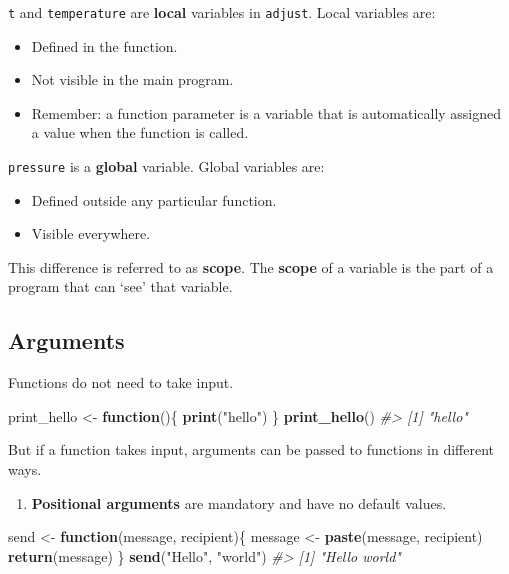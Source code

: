 \documentclass[]{book}
\newenvironment{Shaded}{\begin{snugshade}}{\end{snugshade}}
\newcommand{\KeywordTok}[1]{\textcolor[rgb]{0.13,0.29,0.53}{\textbf{#1}}}
\newcommand{\StringTok}[1]{\textcolor[rgb]{0.31,0.60,0.02}{#1}}
\newcommand{\CommentTok}[1]{\textcolor[rgb]{0.56,0.35,0.01}{\textit{#1}}}
\newcommand{\ControlFlowTok}[1]{\textcolor[rgb]{0.13,0.29,0.53}{\textbf{#1}}}
\newcommand{\NormalTok}[1]{#1}
\providecommand{\tightlist}{%
  \setlength{\itemsep}{0pt}\setlength{\parskip}{0pt}}
\begin{document}
\texttt{t} and \texttt{temperature} are \textbf{local} variables in
\texttt{adjust}. Local variables are:

\begin{itemize}
\tightlist
\item
  Defined in the function.
\item
  Not visible in the main program.
\item
  Remember: a function parameter is a variable that is automatically
  assigned a value when the function is called.
\end{itemize}

\texttt{pressure} is a \textbf{global} variable. Global variables are:

\begin{itemize}
\tightlist
\item
  Defined outside any particular function.
\item
  Visible everywhere.
\end{itemize}

This difference is referred to as \textbf{scope}. The \textbf{scope} of
a variable is the part of a program that can `see' that variable.

\subsection{Arguments}\label{arguments-1}

Functions do not need to take input.

\begin{Shaded}
\begin{Highlighting}[]
\NormalTok{print_hello <-}\StringTok{ }\ControlFlowTok{function}\NormalTok{()\{}
    \KeywordTok{print}\NormalTok{(}\StringTok{"hello"}\NormalTok{)}
\NormalTok{\}}
\KeywordTok{print_hello}\NormalTok{()}
\CommentTok{#> [1] "hello"}
\end{Highlighting}
\end{Shaded}

But if a function takes input, arguments can be passed to functions in
different ways.

\begin{enumerate}
\def\labelenumi{\arabic{enumi})}
\tightlist
\item
  \textbf{Positional arguments} are mandatory and have no default
  values.
\end{enumerate}

\begin{Shaded}
\begin{Highlighting}[]
\NormalTok{send <-}\StringTok{ }\ControlFlowTok{function}\NormalTok{(message, recipient)\{}
\NormalTok{  message <-}\StringTok{ }\KeywordTok{paste}\NormalTok{(message, recipient)}
  \KeywordTok{return}\NormalTok{(message)}
\NormalTok{\}}
\KeywordTok{send}\NormalTok{(}\StringTok{"Hello"}\NormalTok{, }\StringTok{"world"}\NormalTok{)}
\CommentTok{#> [1] "Hello world"}
\end{Highlighting}
\end{Shaded}
\end{document}
